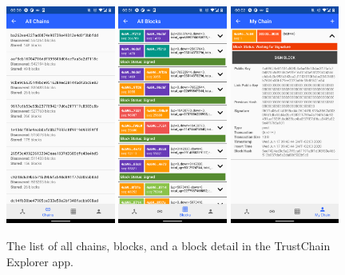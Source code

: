 \begin{figure}
    \centering
    \includegraphics[width=0.32\textwidth]{screens/superapp/explorer_chains}
    \includegraphics[width=0.32\textwidth]{screens/superapp/explorer_blocks}
    \includegraphics[width=0.32\textwidth]{screens/superapp/explorer_mychain}
    \caption{The list of all chains, blocks, and a block detail in the TrustChain Explorer app.}
    \label{trustchainexplorer}
\end{figure}


